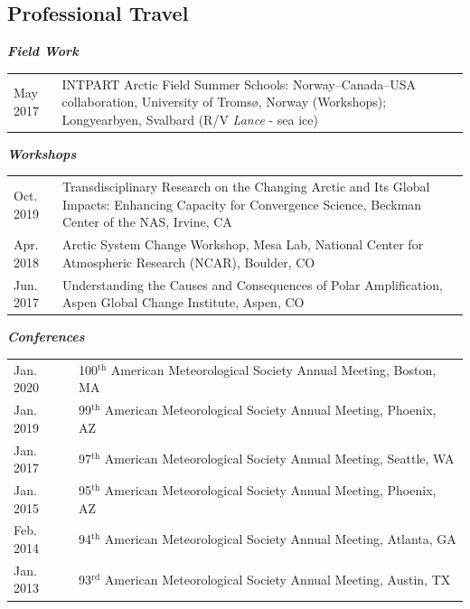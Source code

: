 \documentclass[margin,line,palatino,courier,10pt]{res}
\begin{document}
\begin{resume}
\section{\sc \textcolor{Cerulean}{\large{\textbf{Professional Travel}}}}
\textit{\textbf{Field Work}}
\vspace*{0.05in}\\
\begin{tabular}{@{}p{0.9in}p{4in}}
May 2017 & INTPART Arctic Field Summer Schools: Norway--Canada--USA collaboration, University of Troms\o, Norway (Workshops); Longyearbyen, Svalbard (R/V \textit{Lance} - sea ice)
\end{tabular}

\textit{\textbf{Workshops}}
\vspace*{0.05in}\\
\begin{tabular}{@{}p{0.9in}p{4in}}
Oct. 2019 & Transdisciplinary Research on the Changing Arctic and Its Global Impacts:  Enhancing Capacity for Convergence Science, Beckman Center of the NAS, Irvine, CA\\
Apr. 2018 & Arctic System Change Workshop, Mesa Lab, National Center for Atmospheric Research (NCAR), Boulder, CO\\
Jun. 2017 & Understanding the Causes and Consequences of Polar Amplification, Aspen Global Change Institute, Aspen, CO
\end{tabular}

\textit{\textbf{Conferences}}
\vspace*{0.05in}\\
\begin{tabular}{@{}p{0.9in}p{4in}}
Jan. 2020 & 100$^\text{th} $ American Meteorological Society Annual Meeting, Boston, MA\\
Jan. 2019 & 99$^\text{th} $ American Meteorological Society Annual Meeting, Phoenix, AZ \\
Jan. 2017 & 97$^\text{th} $ American Meteorological Society Annual Meeting, Seattle, WA \\
Jan. 2015 & 95$^\text{th} $ American Meteorological Society Annual Meeting, Phoenix, AZ \\
Feb. 2014 & 94$^\text{th} $ American Meteorological Society Annual Meeting, Atlanta, GA \\
Jan. 2013 & 93$^\text{rd} $ American Meteorological Society Annual Meeting, Austin, TX \\
\end{tabular}


\end{resume}
\end{document}
